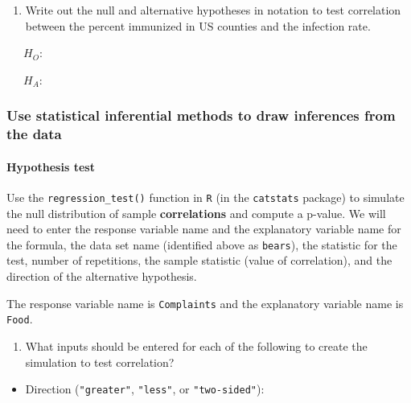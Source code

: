 \documentclass[
]{report}
\providecommand{\tightlist}{%
  \setlength{\itemsep}{0pt}\setlength{\parskip}{0pt}}
\begin{document}
\begin{enumerate}
\def\labelenumi{\arabic{enumi}.}
\setcounter{enumi}{6}
\tightlist
\item
  Write out the null and alternative hypotheses in notation to test correlation between the percent immunized in US counties and the infection rate.
\end{enumerate}

~~~\(H_O:\)

~~~\(H_A:\)

\hypertarget{use-statistical-inferential-methods-to-draw-inferences-from-the-data-7}{%
\subsubsection*{Use statistical inferential methods to draw inferences from the data}\label{use-statistical-inferential-methods-to-draw-inferences-from-the-data-7}}

\hypertarget{hypothesis-test-4}{%
\paragraph*{Hypothesis test}\label{hypothesis-test-4}}

Use the \texttt{regression\_test()} function in \texttt{R} (in the \texttt{catstats} package) to simulate the null distribution of sample \textbf{correlations} and compute a p-value. We will need to enter the response variable name and the explanatory variable name for the formula, the data set name (identified above as \texttt{bears}), the statistic for the test, number of repetitions, the sample statistic (value of correlation), and the direction of the alternative hypothesis.

The response variable name is \texttt{Complaints} and the explanatory variable name is \texttt{Food}.

\begin{enumerate}
\def\labelenumi{\arabic{enumi}.}
\setcounter{enumi}{7}
\tightlist
\item
  What inputs should be entered for each of the following to create the simulation to test correlation?
\end{enumerate}

\vspace{.5 mm}

\begin{itemize}
\tightlist
\item
  Direction (\texttt{"greater"}, \texttt{"less"}, or \texttt{"two-sided"}):
\end{itemize}
\end{document}
